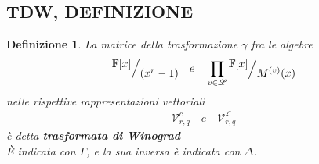 \documentclass[mathserif]{beamer}
\def\quotient#1#2{%
   \raise1ex\hbox{$#1$}\Big/\lower1ex\hbox{$#2$}%
}
\newtheorem{definizione}{Definizione}
\begin{document}
\subsection{TDW, DEFINIZIONE}
\begin{frame}
    \begin{definizione}
      La matrice della trasformazione $\gamma$ fra le algebre
      \begin{align*}
         \quotient{\mathbb{F} \lbrack x \rbrack  }{ (x^{r} - 1)}
         \quad
         e
         \quad
         \prod_{v\in \mathscr{L}} \quotient{\mathbb{F} \lbrack x \rbrack  }{M^{(v)}(x)}
      \end{align*}
      nelle rispettive rappresentazioni vettoriali
      \begin{align*}
         \mathcal{V}_{r, q}^{c} \quad e \quad \mathcal{V}_{r,q}^{\mathscr{L}}
      \end{align*}
      è detta {\bf trasformata di Winograd} \\
      È indicata con $\Gamma$, e la sua inversa è indicata con $\Delta$.
    \end{definizione}
\end{frame}
\end{document}

